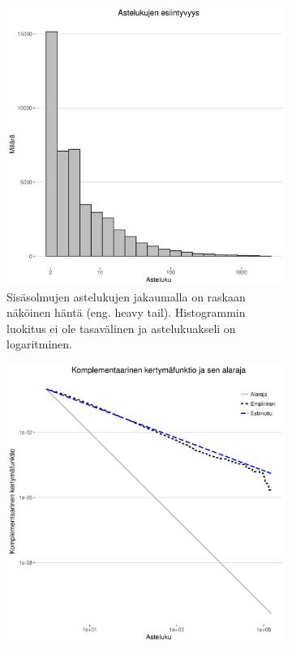 \documentclass[finnish, 12pt, a4paper, sci, utf8, pdfa]{aaltothesis}
\begin{document}
\begin{figure}[htb]
\centering
   \begin{subfigure}[b]{0.47\textwidth}
      \includegraphics[width=\textwidth]{pictures/approx_hist.jpg}
      \caption{Sisäsolmujen astelukujen jakaumalla on raskaan näköinen häntä (eng. heavy tail). Histogrammin luokitus ei ole tasavälinen ja astelukuakseli on logaritminen. \label{figure:approx_hist}}
   \end{subfigure}
   \quad
   \begin{subfigure}[b]{0.47\textwidth}
      \includegraphics[width=\textwidth]{pictures/approx_cdf.jpg}

\end{subfigure}
\end{figure}
\end{document}
